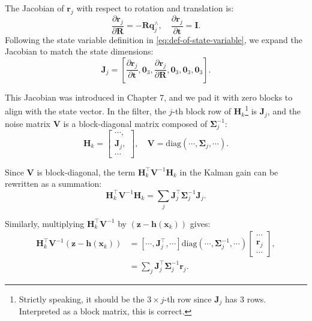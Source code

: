 The Jacobian of \(\mathbf{r}_j\) with respect to rotation and translation is:  
\begin{equation}\label{key}  
	\frac{\partial \mathbf{r}_j}{\partial \mathbf{R}} = -\mathbf{R} \mathbf{q}_j^\wedge, \quad \frac{\partial \mathbf{r}_j}{\partial \mathbf{t}} = \mathbf{I}.  
\end{equation}  
Following the state variable definition in \eqref{eq:def-of-state-variable}, we expand the Jacobian to match the state dimensions:  
\begin{equation}\label{key}  
	\mathbf{J}_j = \left[\frac{\partial \mathbf{r}_j}{\partial \mathbf{t}}, \mathbf{0}_{3}, \frac{\partial \mathbf{r}_j}{\partial \mathbf{R}}, \mathbf{0}_3, \mathbf{0}_3, \mathbf{0}_3 \right].  
\end{equation}  

This Jacobian was introduced in Chapter 7, and we pad it with zero blocks to align with the state vector. In the filter, the \( j \)-th block row of \(\mathbf{H}_k\)\footnote{Strictly speaking, it should be the \( 3 \times j \)-th row since \(\mathbf{J}_j\) has 3 rows. Interpreted as a block matrix, this is correct.} is \(\mathbf{J}_j\), and the noise matrix \(\mathbf{V}\) is a block-diagonal matrix composed of \(\boldsymbol{\Sigma}^{-1}_j\):  
\begin{equation}\label{key}  
	\mathbf{H}_k = \begin{bmatrix}  
		\cdots, \\  
		\mathbf{J}_j, \\  
		\cdots  
	\end{bmatrix}, \quad \mathbf{V} = \mathrm{diag}(\cdots, \boldsymbol{\Sigma}_j, \cdots).  
\end{equation}  

Since \(\mathbf{V}\) is block-diagonal, the term \(\mathbf{H}_k^\top \mathbf{V}^{-1} \mathbf{H}_k\) in the Kalman gain can be rewritten as a summation:  
\begin{equation}\label{key}  
	\mathbf{H}_k^\top \mathbf{V}^{-1} \mathbf{H}_k = \sum\limits_{j} \mathbf{J}_j^\top \boldsymbol{\Sigma}_j^{-1} \mathbf{J}_j.  
\end{equation}  

Similarly, multiplying \(\mathbf{H}_k^\top \mathbf{V}^{-1}\) by \((\mathbf{z} - \mathbf{h}(\mathbf{x}_k))\) gives:  
\begin{align}\label{key}  
	\mathbf{H}_k^\top \mathbf{V}^{-1} (\mathbf{z} - \mathbf{h}(\mathbf{x}_k)) &= \left[\cdots, \mathbf{J}_j^\top, \cdots \right] \mathrm{diag}(\cdots, \boldsymbol{\Sigma}_j^{-1}, \cdots) \begin{bmatrix}  
		\cdots \\ \mathbf{r}_j \\ \cdots  
	\end{bmatrix}, \\  
	&= \sum\limits_{j} \mathbf{J}_j^\top \boldsymbol{\Sigma}_j^{-1} \mathbf{r}_j.  
\end{align}  

